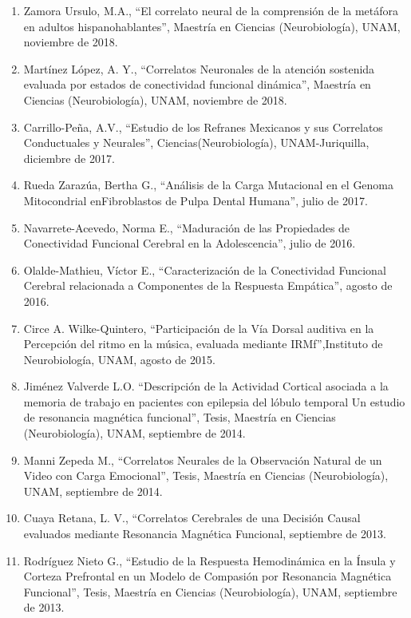 \begin{enumerate}
\item Zamora Ursulo, M.A., “El correlato neural de la comprensión de la metáfora en adultos hispanohablantes”, Maestría en Ciencias 
(Neurobiología), UNAM, noviembre de 2018.

\item Martínez López, A. Y., “Correlatos Neuronales de la atención sostenida evaluada por estados de conectividad funcional dinámica”, 
Maestría en 
Ciencias (Neurobiología), UNAM, noviembre de 2018.

\item Carrillo-Peña, A.V., “Estudio de los Refranes Mexicanos y sus Correlatos Conductuales y Neurales”, Ciencias(Neurobiología), 
UNAM-Juriquilla, 
diciembre de 2017.

\item Rueda Zarazúa, Bertha G., “Análisis de la Carga Mutacional en el Genoma Mitocondrial enFibroblastos de Pulpa Dental Humana”, julio de 
2017.

\item Navarrete-Acevedo, Norma E., “Maduración de las Propiedades de Conectividad Funcional Cerebral en la Adolescencia”, julio de 2016.

\item Olalde-Mathieu, Víctor E., “Caracterización de la Conectividad Funcional Cerebral relacionada a Componentes de la Respuesta Empática”, 
agosto 
de 2016.

\item Circe A. Wilke-Quintero, “Participación de la Vía Dorsal auditiva en la Percepción del ritmo en la música, evaluada mediante 
IRMf”,Instituto 
de Neurobiología, UNAM, agosto de 2015.

\item Jiménez Valverde L.O. “Descripción de la Actividad Cortical asociada a la memoria de trabajo en pacientes con epilepsia del lóbulo 
temporal 
Un estudio de resonancia magnética funcional”, Tesis, Maestría en Ciencias (Neurobiología), UNAM, septiembre de 2014.

\item Manni Zepeda M., “Correlatos Neurales de la Observación Natural de un Video con Carga Emocional”, Tesis, Maestría en Ciencias 
(Neurobiología), UNAM, septiembre de 2014.

\item Cuaya Retana, L. V., “Correlatos Cerebrales de una Decisión Causal evaluados mediante Resonancia Magnética Funcional, septiembre de 
2013.

\item Rodríguez Nieto G., “Estudio de la Respuesta Hemodinámica en la Ínsula y Corteza Prefrontal en un Modelo de Compasión por Resonancia 
Magnética Funcional”, Tesis, Maestría en Ciencias (Neurobiología), UNAM, septiembre de 2013.


\end{enumerate}
